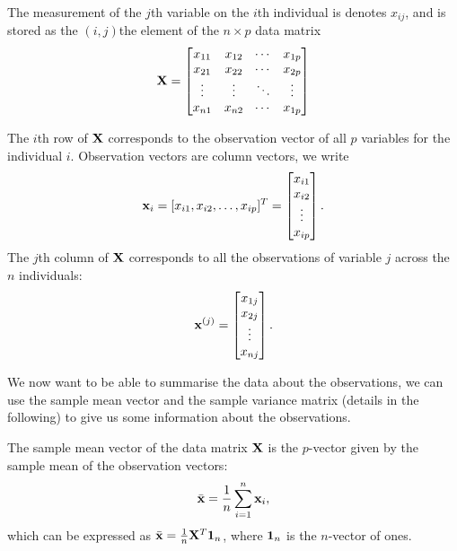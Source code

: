 \documentclass[10pt, a4paper]{article}
\begin{document}
\begin{definition}
    The measurement of the $j$th variable on the $i$th individual is denotes $x_{ij}$,
    and is stored as the $(i, j)$the element of the $n \times p$ data matrix
    \[
    \mathbf{X} = \begin{bmatrix}
        x_{11} & x_{12} & \dotsi & x_{1p} \\
        x_{21} & x_{22} & \dotsi & x_{2p} \\
        \vdots & \vdots & \ddots & \vdots \\
        x_{n1} & x_{n2} & \dotsi & x_{1p}
    \end{bmatrix}
    \]
\end{definition}
The $i$th row of $\mathbf{X}$ corresponds to the observation vector of all $p$ variables for the individual $i$.
Observation vectors are column vectors,
we write
\[
\mathbf{x}_i = [x_{i1}, x_{i2}, \dotsc, x_{ip}] ^ T = \begin{bmatrix}
    x_{i1} \\
    x_{i2} \\
    \vdots \\
    x_{ip}
\end{bmatrix}.
\]
The $j$th column of $\mathbf{X}$ corresponds to all the observations of variable $j$ across the $n$ individuals:
\[
\mathbf{x} ^ {(j)} = \begin{bmatrix}
    x_{1j} \\
    x_{2j} \\
    \vdots \\
    x_{nj}
\end{bmatrix}.
\]

We now want to be able to summarise the data about the observations,
we can use the sample mean vector and the sample variance matrix
(details in the following)
to give us some information about the observations.

\begin{definition}
    The sample mean vector of the data matrix $\mathbf{X}$ is the $p$-vector given by the sample mean of the observation vectors:
    \[
    \bar{\mathbf{x}} = \frac{1}{n}\sum_{i = 1}^{n}\mathbf{x}_i,
    \]
    which can be expressed as $\bar{\mathbf{x}} = \frac{1}{n}\mathbf{X} ^ T\mathbf{1}_n$,
    where $\mathbf{1}_n$ is the $n$-vector of ones.
\end{definition}
\end{document}
